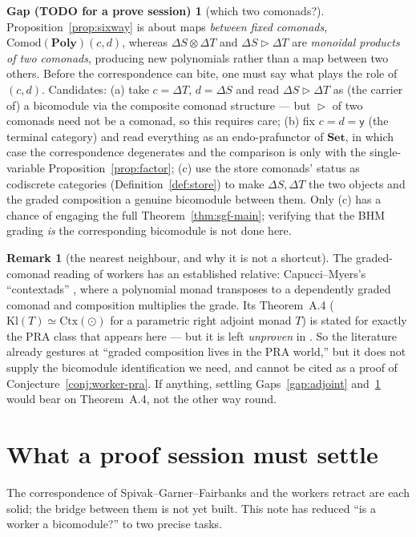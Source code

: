 \documentclass[11pt]{amsart}
\theoremstyle{plain}
\theoremstyle{definition}
\newtheorem{remark}[theorem]{Remark}
\theoremstyle{gap}
\newtheorem{gap}[theorem]{Gap (TODO for a prove session)}
\newcommand{\Poly}{\mathbf{Poly}}
\newcommand{\Set}{\mathbf{Set}}
\newcommand{\Comod}{\mathrm{Comod}}
\renewcommand{\lhd}{\vartriangleright}
\newcommand{\Store}[1]{\Delta #1}
\newcommand{\yon}{\mathsf{y}}
\begin{document}
\begin{gap}[which two comonads?]\label{gap:cd}
Proposition~\ref{prop:sixway} is about maps \emph{between fixed comonads},
$\Comod(\Poly)(c,d)$, whereas $\Store{S}\otimes\Store{T}$ and
$\Store{S}\lhd\Store{T}$ are \emph{monoidal products of two comonads}, producing new
polynomials rather than a map between two others. Before the correspondence can bite,
one must say what plays the role of $(c,d)$. Candidates: (a) take $c=\Store{T}$,
$d=\Store{S}$ and read $\Store{S}\lhd\Store{T}$ as (the carrier of) a bicomodule via
the composite comonad structure --- but $\lhd$ of two comonads need not be a comonad,
so this requires care; (b) fix $c=d=\yon$ (the terminal category) and read everything
as an endo-prafunctor of $\Set$, in which case the correspondence degenerates and the
comparison is only with the single-variable Proposition~\ref{prop:factor}; (c) use
the store comonads' status as codiscrete categories (Definition~\ref{def:store}) to
make $\Store{S},\Store{T}$ the two objects and the graded composition a genuine
bicomodule between them. Only (c) has a chance of engaging the full
Theorem~\ref{thm:sgf-main}; verifying that the BHM grading \emph{is} the
corresponding bicomodule is not done here.
\end{gap}

\begin{remark}[the nearest neighbour, and why it is not a shortcut]
The graded-comonad reading of workers has an established relative:
Capucci--Myers's ``contextads'' \cite{ContextadsWreaths}, where a polynomial monad
transposes to a dependently graded comonad and composition multiplies the grade. Its
Theorem~A.4 ($\mathrm{Kl}(T)\simeq\mathrm{Ctx}(\odot)$ for a parametric right adjoint
monad $T$) is stated for exactly the PRA class that appears here --- but it is left
\emph{unproven} in \cite{ContextadsWreaths}. So the literature already gestures at
``graded composition lives in the PRA world,'' but it does not supply the
bicomodule identification we need, and cannot be cited as a proof of
Conjecture~\ref{conj:worker-pra}. If anything, settling Gaps~\ref{gap:adjoint}
and~\ref{gap:cd} would bear on Theorem~A.4, not the other way round.
\end{remark}

\section{What a proof session must settle}\label{sec:conc}

The correspondence of Spivak--Garner--Fairbanks and the workers retract are each
solid; the bridge between them is not yet built. This note has reduced ``is a worker a
bicomodule?'' to two precise tasks.
\end{document}
